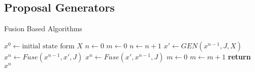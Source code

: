 \documentclass[10pt,twocolumn,letterpaper]{article}
\begin{document}






\subsection{Proposal Generators}


\begin{algorithm}
\begin{scriptsize}
\caption{Fusion Based Algorithms}\label{alg:fusion}
\begin{algorithmic}[1]
\State $x^0 \gets \textrm{initial state form } X$
\State $n \gets 0 $                                 
\State $m \gets 0 $                                 
\State $n \gets n+1$ 
 \State $x'\gets GEN(x^{n-1},J,X)$                    
   \State $x^{n} \gets Fuse(x^{n-1},x',J)$             
 \Else
   \State $x^{n} \gets Fuse(x',x^{n-1},J)$
 \EndIf
   \State $m \gets 0$                                 
 \Else
   \State $m \gets m+1$                               
 \EndIf
\EndWhile
\State \textbf{return} $x^n$
\EndProcedure
\end{algorithmic}
\end{scriptsize}
\end{algorithm}
\end{document}
